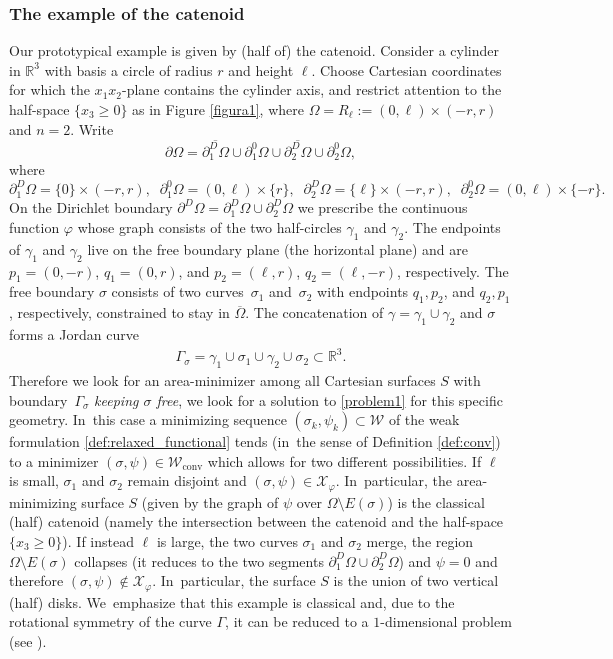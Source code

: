 \documentclass[JEP,XML,SOM,Unicode, NoFloatCountersInSection,published]{cedram}
\newcommand{\R}{\mathbb{R}}
\let\Om\Omega
\newcommand\admclassconv{{\mathcal W_\mathrm{conv}}}
\theoremstyle{definition}
\begin{document}
\subsubsection*{The example of the catenoid}
Our prototypical example is given by (half of) the catenoid.
Consider a cylinder in $\R^3$ with basis a circle of radius $r$
and height $\ell$.
Choose Cartesian coordinates for which the $x_1x_2$-plane
contains the cylinder axis, and restrict attention to the half-space
$\{x_3\geq0\}$ as
in Figure \ref{figura1},
where $\Omega=R_\ell := (0,\ell)\times(-r,r)$ and $n=2$.
Write
\[
\partial \Omega=\overline{\partial^D_1\Om}\cup\partial^0_1\Omega\cup \overline{\partial^D_2\Om}\cup \partial^0_2\Omega,
\]
where
\[
\partial^D_1\Om=\{0\}\times(-r,r),\;\; \partial^0_1\Omega=(0,\ell)\times\{r\},\;\; \partial^D_2\Om=\{\ell\}\times(-r,r),\;\; \partial^0_2\Omega=(0,\ell)\times\{-r\}.
\]
On the Dirichlet boundary $\partial^D\Om=\partial^D_1\Om\cup\partial^D_2\Om$ we prescribe the continuous function $\varphi$ whose graph
consists of the two half-circles $\gamma_1$ and $\gamma_2$. The endpoints of $\gamma_1$ and $\gamma_2$ live on the
free boundary plane (the horizontal plane) and are $p_1=(0,-r)$, $q_1=(0,r)$, and $p_2=(\ell,r)$, $q_2=(\ell,-r)$, respectively. The free boundary
$\sigma$ consists of two curves~$\sigma_1$ and~$\sigma_2$
with endpoints $q_1,p_2$, and $q_2,p_1$, respectively,
constrained to stay in $\overline\Omega$. The concatenation of $\gamma=\gamma_1\cup\gamma_2$ and $\sigma$
forms a Jordan curve
\begin{align}\label{gammasigma}
\Gamma_\sigma=\gamma_1\cup\sigma_1\cup\gamma_2\cup\sigma_2 \subset
\R^3.
\end{align}
Therefore we look for an area-minimizer
among all Cartesian surfaces $S$ with boundary~$\Gamma_\sigma$
{\it keeping $\sigma$ free}, \ie we look for a solution to \eqref{problem1} for this specific geometry. In~this case a minimizing sequence $(\sigma_k,\psi_k)\subset\mathcal W$ of the weak formulation \eqref{def:relaxed_functional} tends (in~the sense of Definition \ref{def:conv}) to a minimizer $(\sigma,\psi)\in \admclassconv$ which allows for two different possibilities. If $\ell$ is small, $\sigma_1$ and $\sigma_2$ remain disjoint and $(\sigma,\psi)\in\mathcal X_\varphi$. In~particular, the area-minimizing surface $S$ (given by the graph of $\psi$ over $\Om\setminus E(\sigma)$) is the classical (half) catenoid (namely the intersection between the catenoid and the half-space $\{x_3\geq0\}$). If instead $\ell$ is large, the two curves $\sigma_1$ and $\sigma_2$ merge, the region $\Om\setminus E(\sigma)$ collapses (\ie it reduces to the two segments $\partial_1^D\Omega\cup\partial_2^D\Omega$) and $\psi=0$ and therefore $(\sigma,\psi)\notin\mathcal X_\varphi$. In~particular, the surface $S$ is
the union of two vertical (half) disks. We~emphasize that this example is classical and, due
to the rotational symmetry of the curve $\Gamma$, it can be
reduced to a $1$-dimensional problem (see \cite{Greco,Bevi}).
\end{document}

